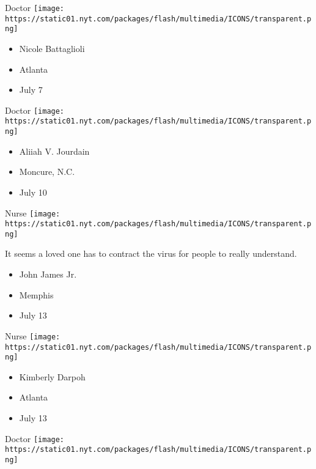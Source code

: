 \protect\hyperlink{item-nicole-battaglioli}{}

Doctor
\texttt{[image: https://static01.nyt.com/packages/flash/multimedia/ICONS/transparent.png]}

\begin{itemize}
\tightlist
\item
  Nicole Battaglioli
\item
  Atlanta
\item
  July 7
\end{itemize}

\protect\hyperlink{item-aliiah-v-jourdain}{}

Doctor
\texttt{[image: https://static01.nyt.com/packages/flash/multimedia/ICONS/transparent.png]}

\begin{itemize}
\tightlist
\item
  Aliiah V. Jourdain
\item
  Moncure, N.C.
\item
  July 10
\end{itemize}

\protect\hyperlink{item-john-james-jr}{}

Nurse
\texttt{[image: https://static01.nyt.com/packages/flash/multimedia/ICONS/transparent.png]}

It seems a loved one has to contract the virus for people to really
understand.

\begin{itemize}
\tightlist
\item
  John James Jr.
\item
  Memphis
\item
  July 13
\end{itemize}

\protect\hyperlink{item-kimberly-darpoh}{}

Nurse
\texttt{[image: https://static01.nyt.com/packages/flash/multimedia/ICONS/transparent.png]}

\begin{itemize}
\tightlist
\item
  Kimberly Darpoh
\item
  Atlanta
\item
  July 13
\end{itemize}

\protect\hyperlink{item-melhim-bou-alwan}{}

Doctor
\texttt{[image: https://static01.nyt.com/packages/flash/multimedia/ICONS/transparent.png]}

